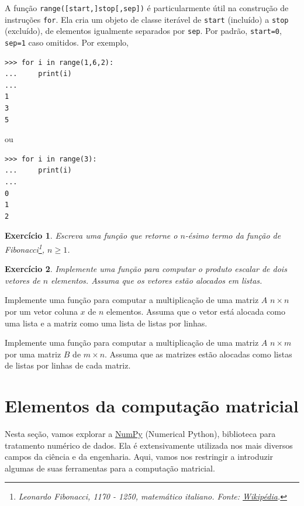 \documentclass[12pt]{article}
\newtheorem{exr}{Exercício}[section]
\begin{document}
A função {\python} \lstinline+range([start,]stop[,sep])+ é particularmente útil na construção de instruções \lstinline+for+. Ela cria um objeto de classe iterável de \lstinline+start+ (incluído) a \lstinline+stop+ (excluído), de elementos igualmente separados por \lstinline+sep+. Por padrão, \lstinline+start=0+, \lstinline+sep=1+ caso omitidos. Por exemplo,
\begin{lstlisting}
>>> for i in range(1,6,2):
...     print(i)
... 
1
3
5
\end{lstlisting}
ou
\begin{lstlisting}
>>> for i in range(3):
...     print(i)
... 
0
1
2
\end{lstlisting}

\begin{exr}
  Escreva uma função que retorne o $n$-ésimo termo da função de Fibonacci\footnote{Leonardo Fibonacci, 1170 - 1250, matemático italiano. Fonte: \href{https://pt.wikipedia.org/wiki/Leonardo\_Fibonacci}{Wikipédia}.}, $n\geq 1$. 
\end{exr}

\begin{exr}
  Implemente uma função para computar o produto escalar de dois vetores de $n$ elementos. Assuma que os vetores estão alocados em listas.
\end{exr}

\begin{exer}
  Implemente uma função para computar a multiplicação de uma matriz $A$ $n\times n$ por um vetor coluna $x$ de $n$ elementos. Assuma que o vetor está alocada como uma lista e a matriz como uma lista de listas por linhas.
\end{exer}

\begin{exer}
  Implemente uma função para computar a multiplicação de uma matriz $A$ $n\times m$ por uma matriz $B$ de $m\times n$. Assuma que as matrizes estão alocadas como listas de listas por linhas de cada matriz.
\end{exer}

\section{Elementos da computação matricial}\label{sec_mat}

Nesta seção, vamos explorar a \href{https://numpy.org/}{NumPy} (Numerical Python), biblioteca para tratamento numérico de dados. Ela é extensivamente utilizada nos mais diversos campos da ciência e da engenharia. Aqui, vamos nos restringir a introduzir algumas de suas ferramentas para a computação matricial.
\end{document}
